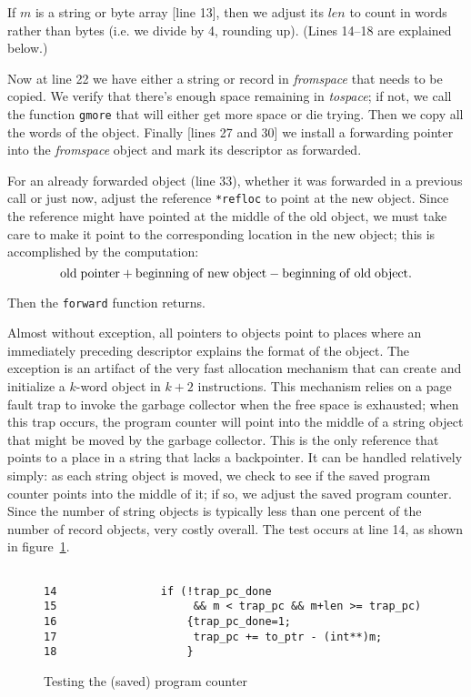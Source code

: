 If $m$ is a string or byte array [line 13],
then we adjust its $len$ to count in words rather
than bytes (i.e. we divide by 4, rounding up).
(Lines 14--18 are explained below.)

Now at line 22 we have either a string or record in {\em fromspace}
that needs to be copied.  We verify that there's enough space remaining
in {\em tospace}; if not, we call the function \verb"gmore" that will either
get more space or die trying.  Then we copy all the words of the
object.  Finally [lines 27 and 30] we install a forwarding pointer
into the {\em fromspace} object and mark its descriptor as forwarded.

For an already forwarded object (line 33), whether it was forwarded
in a previous call or just now, adjust the reference \verb|*refloc|
to point at the new object.  Since the reference might have pointed
at the middle of the old object, we must take care to make it point
to the corresponding location in the new object; this is accomplished
by the computation:
\[
{\rm old\;pointer} + {\rm beginning\;of\;new\;object} - 
{\rm beginning\;of\;old\;object.}
\]

Then the \verb"forward" function returns.

Almost without exception, all pointers to objects point to places where
an immediately preceding descriptor
explains the format of the object.
The exception is an artifact of the 
very fast allocation mechanism that can create and initialize
a $k$-word object in $k+2$ instructions\cite{appel89:sggc}.
This mechanism relies on a page fault
trap to invoke the garbage collector
when the free space is exhausted; when this trap occurs, the program
counter will point into the middle of a string object that might
be moved by the garbage collector.  This is the only reference that
points to a place in a string that lacks a backpointer.
It can be handled
relatively simply: as each string object is moved, we check to see
if the saved program counter points into the middle of it; if so,
we adjust the saved program counter.  Since the number of string objects
is typically less than one percent of the number of record objects,
very costly overall.  The test occurs at line 14, as shown in
figure~\ref{trappc}.
\begin{figure}[htbp]
\label{trappc}
\begin{verbatim}

14                if (!trap_pc_done 
15                     && m < trap_pc && m+len >= trap_pc)
16                    {trap_pc_done=1;
17                     trap_pc += to_ptr - (int**)m;
18                    }
\end{verbatim}
\caption{Testing the (saved) program counter}
\end{figure}

